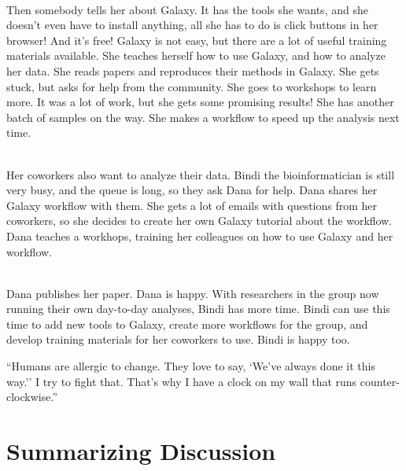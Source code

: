 \begin{center}
\begin{minipage}{5in}
\begin{center}
{\ \\
Then somebody tells her about Galaxy. It has the tools she wants, and she doesn't even have to install anything, all she has to do is click buttons in her browser! And it's free! Galaxy is not easy, but there are a lot of useful training materials available. She teaches herself how to use Galaxy, and how to analyze her data. She reads papers and reproduces their methods in Galaxy. She gets stuck, but asks for help from the community. She goes to workshops to learn more. It was a lot of work, but she gets some promising results! She has another batch of samples on the way. She makes a workflow to speed up the analysis next time.

\ \\
Her coworkers also want to analyze their data. Bindi the bioinformatician is still very busy, and the queue is long, so they ask Dana for help. Dana shares her Galaxy workflow with them. She gets a lot of emails with questions from her coworkers, so she decides to create her own Galaxy tutorial about the workflow. Dana teaches a workhops, training her colleagues on how to use Galaxy and her workflow.

\ \\
Dana publishes her paper. Dana is happy. With researchers in the group now running their own day-to-day analyses, Bindi has more time. Bindi can use this time to add new tools to Galaxy, create more workflows for the group, and develop training materials for her coworkers to use. Bindi is happy too.
\normalsize
}
\end{center}
\end{minipage}
\end{center}

\cleartorightpage

\begin{savequote}[75mm]
``Humans are allergic to change. They love to say, `We've always done it this way.'' I try to fight that. That's why I have a clock on my wall that runs counter-clockwise.''
\end{savequote}

\chapter{Summarizing Discussion}\label{discussion}
\setcounter{figure}{-1}
\setcounter{table}{-1}
\setcounter{section}{-1}
\setcounter{NAT@ctr}{-1}

